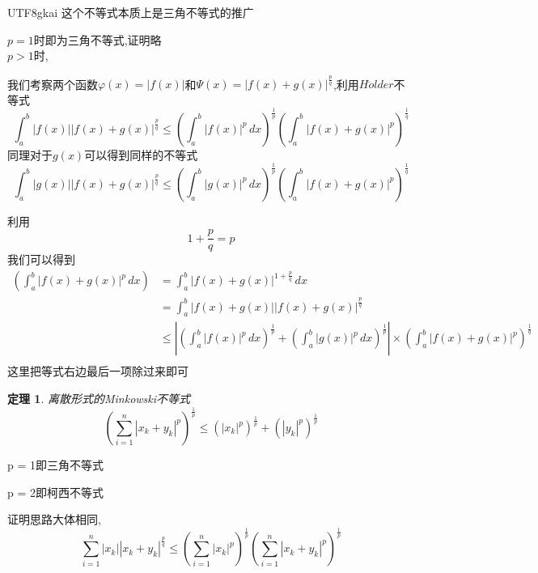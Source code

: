 \documentclass{article}
\newtheorem{theorem}{定理}[subsection]
\newenvironment{cproof}{%
\heiti{证明}\kaishu
}{%
}
\newcommand{\parameter}[1]{\left(#1\right)}
\newcommand{\abs}[1]{\left|#1\right|}
\begin{document}
\begin{CJK}{UTF8}{gkai}
这个不等式本质上是三角不等式的推广

\begin{cproof}

$p = 1$时即为三角不等式,证明略\\

$p > 1$时,

我们考察两个函数$\varphi(x) = |f(x)|$和$\varPsi(x) = \abs{f(x) + g(x)}^{\frac{p}{q}}$,利用$H\ddot{o}lder$不等式
\begin{equation}
  \int_{a}^{b}\abs{f(x)}\abs{f(x)+ g(x)}^{\frac{p}{q}} \leq \parameter{\int_{a}^{b}\abs{f(x)}^p\, dx}^{\frac{1}{p}} \parameter{\int_{a}^{b}\abs{f(x) + g(x)}^p}^{\frac{1}{q}}
\end{equation}
  同理对于$g(x)$可以得到同样的不等式
\begin{equation}
  \int_{a}^{b}\abs{g(x)}\abs{f(x)+ g(x)}^{\frac{p}{q}} \leq \parameter{\int_{a}^{b}\abs{g(x)}^p\, dx}^{\frac{1}{p}} \parameter{\int_{a}^{b}\abs{f(x) + g(x)}^p}^{\frac{1}{q}}
\end{equation}

利用\[1 + \dfrac{p}{q} = p\]
我们可以得到
\[
\begin{aligned}
  \parameter{\int_{a}^{b} \abs{f(x) + g(x)}^p\, dx} &= \int_{a}^{b}\abs{f(x) + g(x)}^{1 + \frac{p}{q}}\,dx \\
  &= \int_{a}^{b}\abs{f(x) + g(x)}\abs{f(x)+ g(x)}^{\frac{p}{q}} \\
  &\leq \abs{\parameter{\int_{a}^{b}\abs{f(x)}^p\, dx}^{\frac{1}{p}} + \parameter{\int_{a}^{b}\abs{g(x)}^p\, dx}^{\frac{1}{p}} }\times \parameter{\int_{a}^{b}\abs{f(x) + g(x)}^p}^{\frac{1}{q}}\\
\end{aligned}  
  \]
  这里把等式右边最后一项除过来即可
  

\end{cproof}

\begin{theorem}
  离散形式的Minkowski不等式
  \[\parameter{\sum_{i = 1}^{n} \abs{x_k + y_k}^p}^{\frac{1}{p}} \leq \parameter{\abs{x_k}^p}^{\frac{1}{p}} + \parameter{\abs{y_k}^p}^{\frac{1}{p}}\]
\end{theorem}

p = 1即三角不等式

p = 2即柯西不等式

\begin{cproof}
证明思路大体相同,
\[\sum_{i = 1}^{n}\abs{x_k}\abs{x_k + y_k}^{\frac{p}{q}} \leq \parameter{\sum_{i = 1}^{n} \abs{x_k}^p}^{\frac{1}{p}}
\parameter{\sum_{i = 1}^{n} \abs{x_k + y_k}^p}^{\frac{1}{p}}\]


\end{cproof}
\end{CJK}
\end{document}
